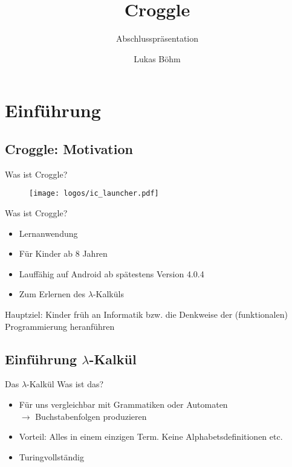 \documentclass[18pt]{beamer}
\title[Croggle Abschlusspräsentation]{Croggle}
\subtitle{Abschlusspräsentation}
\author{Lukas Böhm}
\institute{Praxis der Softwareentwicklung Wintersemester 2013/2014}
\begin{document}

\begin{frame}
\titlepage
\end{frame}


\section{Einführung}
	\subsection{Croggle: Motivation}
	\begin{frame}{Was ist Croggle?}
		\begin{figure}
			\texttt{[image: logos/ic\_launcher.pdf]}
		\end{figure}
	\end{frame}

	\begin{frame}[<+->]{Was ist Croggle?}
		\begin{itemize}
			\item Lernanwendung
			\item Für Kinder ab 8 Jahren
			\item Lauffähig auf Android ab spätestens Version 4.0.4
			\item Zum Erlernen des $\lambda$-Kalküls
		\end{itemize}
		Hauptziel: Kinder früh an Informatik bzw. die Denkweise der (funktionalen) Programmierung heranführen
	\end{frame}

	\subsection{Einführung $\lambda$-Kalkül}
	\begin{frame}[<+->]{Das $\lambda$-Kalkül}
		Was ist das?
		\begin{itemize}
			\item Für uns vergleichbar mit Grammatiken oder Automaten 
				\\ $\rightarrow$ Buchstabenfolgen produzieren
			\item Vorteil: Alles in einem einzigen Term. Keine Alphabetsdefinitionen etc.
			\item Turingvollständig
		\end{itemize}
	\end{frame}
	
\end{document}
